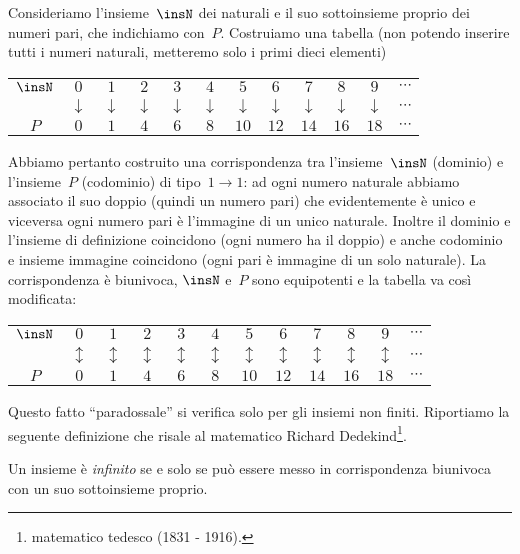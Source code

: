 \begin{exrig}
 \begin{esempio}
Consideriamo l'insieme~$\insN$ dei naturali e il suo sottoinsieme proprio dei numeri pari, che indichiamo con~$P$.
Costruiamo una tabella (non potendo inserire tutti i numeri naturali, metteremo solo i primi dieci elementi)
\begin{center}
 \begin{tabular}{cccccccccccc}
  \toprule
  $\insN$ & $0$ & $1$ & $2$ & $3$ & $4$ & $5$ & $6$ & $7$ & $8$ & $9$ & $\cdots$\\
    & $\downarrow$ & $\downarrow$ & $\downarrow$ & $\downarrow$ & $\downarrow$ & $\downarrow$ & $\downarrow$ & $\downarrow$ & $\downarrow$ &$\downarrow$ & $\cdots$\\
  $P$ & $0$ & $1$ & $4$ & $6$ & $8$ & $10$ & $12$ & $14$ & $16$ & $18$ & $\cdots$\\
  \bottomrule
 \end{tabular}
\end{center}
Abbiamo pertanto costruito una corrispondenza tra l'insieme~$\insN$ (dominio) e l'insieme~$P$ (codominio) di tipo~$1\rightarrow1$:
ad ogni numero naturale abbiamo associato il suo doppio (quindi un numero pari) che evidentemente è unico e viceversa ogni numero pari
è l'immagine di un unico naturale. Inoltre il dominio e l'insieme di definizione coincidono (ogni numero ha il doppio)
e anche codominio e insieme immagine coincidono (ogni pari è immagine di un solo naturale).
La corrispondenza è biunivoca, $\insN$ e~$P$ sono equipotenti e la tabella va così modificata:
\begin{center}
 \begin{tabular}{cccccccccccc}
  \toprule
  $\insN$ & $0$ & $1$ & $2$ & $3$ & $4$ & $5$ & $6$ & $7$ & $8$ & $9$ & $\cdots$\\
    & $\updownarrow$ & $\updownarrow$ & $\updownarrow$ & $\updownarrow$ & $\updownarrow$ & $\updownarrow$ & $\updownarrow$ & $\updownarrow$ & $\updownarrow$ & $\updownarrow$ & $\cdots$\\
  $P$ & $0$ & $1$ & $4$ & $6$ & $8$ & $10$ & $12$ & $14$ & $16$ & $18$ & $\cdots$\\
  \bottomrule
 \end{tabular}
\end{center}
 \end{esempio}
\end{exrig}

Questo fatto ``paradossale'' si verifica solo per gli insiemi non finiti.
Riportiamo la seguente definizione che risale al matematico Richard Dedekind\footnote{matematico tedesco (1831 - 1916).}.
\begin{definizione}
 Un insieme è \emph{infinito} se e solo se può essere messo in corrispondenza biunivoca con un suo sottoinsieme proprio.
\end{definizione}

